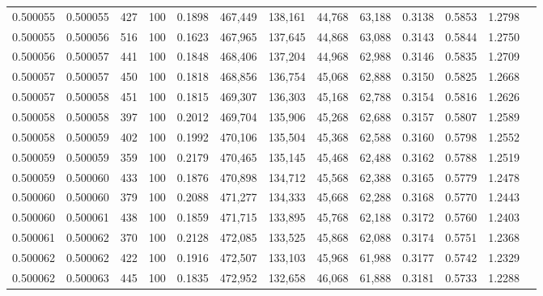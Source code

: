 \begin{tabular}{rrrrrrrrrrrrr}
0.500055 & 0.500055 &   427 & 100 &                                     0.1898 & 467,449 & 138,161 &  44,768 &  63,188 & 0.3138 & 0.5853 & 1.2798 \\
0.500055 & 0.500056 &   516 & 100 &                                     0.1623 & 467,965 & 137,645 &  44,868 &  63,088 & 0.3143 & 0.5844 & 1.2750 \\
0.500056 & 0.500057 &   441 & 100 &                                     0.1848 & 468,406 & 137,204 &  44,968 &  62,988 & 0.3146 & 0.5835 & 1.2709 \\
0.500057 & 0.500057 &   450 & 100 &                                     0.1818 & 468,856 & 136,754 &  45,068 &  62,888 & 0.3150 & 0.5825 & 1.2668 \\
0.500057 & 0.500058 &   451 & 100 &                                     0.1815 & 469,307 & 136,303 &  45,168 &  62,788 & 0.3154 & 0.5816 & 1.2626 \\
0.500058 & 0.500058 &   397 & 100 &                                     0.2012 & 469,704 & 135,906 &  45,268 &  62,688 & 0.3157 & 0.5807 & 1.2589 \\
0.500058 & 0.500059 &   402 & 100 &                                     0.1992 & 470,106 & 135,504 &  45,368 &  62,588 & 0.3160 & 0.5798 & 1.2552 \\
0.500059 & 0.500059 &   359 & 100 &                                     0.2179 & 470,465 & 135,145 &  45,468 &  62,488 & 0.3162 & 0.5788 & 1.2519 \\
0.500059 & 0.500060 &   433 & 100 &                                     0.1876 & 470,898 & 134,712 &  45,568 &  62,388 & 0.3165 & 0.5779 & 1.2478 \\
0.500060 & 0.500060 &   379 & 100 &                                     0.2088 & 471,277 & 134,333 &  45,668 &  62,288 & 0.3168 & 0.5770 & 1.2443 \\
0.500060 & 0.500061 &   438 & 100 &                                     0.1859 & 471,715 & 133,895 &  45,768 &  62,188 & 0.3172 & 0.5760 & 1.2403 \\
0.500061 & 0.500062 &   370 & 100 &                                     0.2128 & 472,085 & 133,525 &  45,868 &  62,088 & 0.3174 & 0.5751 & 1.2368 \\
0.500062 & 0.500062 &   422 & 100 &                                     0.1916 & 472,507 & 133,103 &  45,968 &  61,988 & 0.3177 & 0.5742 & 1.2329 \\
0.500062 & 0.500063 &   445 & 100 &                                     0.1835 & 472,952 & 132,658 &  46,068 &  61,888 & 0.3181 & 0.5733 & 1.2288 \\

\end{tabular}
